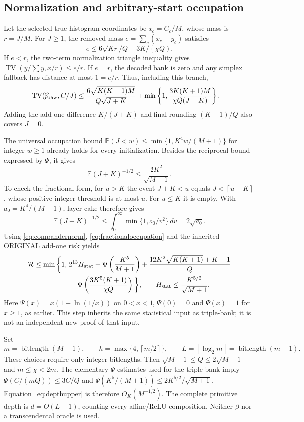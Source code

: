 \documentclass[11pt,letterpaper]{article}
\theoremstyle{definition}\newtheorem{definition}[theorem]{Definition}
\theoremstyle{remark}\newtheorem{remark}[theorem]{Remark}
\newcommand{\TV}{\operatorname{TV}}
\newcommand{\E}{\mathbb{E}}
\newcommand{\Prob}{\mathbb{P}}
\newcommand{\ceil}[1]{\left\lceil #1\right\rceil}
\newcommand{\Risk}{\mathcal{R}}
\newcommand{\bl}{\operatorname{bitlength}}
\begin{document}
\subsection{Normalization and arbitrary-start occupation}
Let the selected true histogram coordinates be $x_c=C_c/M$, whose mass is $r=J/M$. For $J\ge1$, the removed mass $e=\sum_c(x_c-y_c)$ satisfies
\[
 e\le6\sqrt{Kr}/Q+3K/(\chi Q).
\]
If $e<r$, the two-term normalization triangle inequality gives
$\TV(y/\sum y,x/r)\le e/r$. If $e=r$, the decoded bank is zero and any simplex fallback has distance at most $1=e/r$. Thus, including this branch,
\begin{align}\label{eq:compandernorm}
 \TV(\widehat p_{\rm raw},C/J)
 &\le\frac{6\sqrt{K(K+1)M}}{Q\sqrt{J+K}}
   +\min\left\{1,\frac{3K(K+1)M}{\chi Q(J+K)}\right\}.
\end{align}
Adding the add-one difference $K/(J+K)$ and final rounding $(K-1)/Q$ also covers $J=0$.

The universal occupation bound
$\Prob(J<w)\le\min\{1,K^4w/(M+1)\}$ for integer $w\ge1$
already holds for every initialization. Besides the reciprocal bound expressed by $\Psi$, it gives
\begin{equation}\label{eq:fractionaloccupation}
 \E(J+K)^{-1/2}\le\frac{2K^2}{\sqrt{M+1}}.
\end{equation}
To check the fractional form, for $u>K$ the event $J+K<u$ equals
$J<\ceil{u-K}$, whose positive integer threshold is at most $u$.
For $u\le K$ it is empty. With $a_0=K^4/(M+1)$, layer cake therefore gives
\[
 \E(J+K)^{-1/2}
 \le\int_0^\infty\min\{1,a_0/v^2\}\,dv=2\sqrt{a_0}.
\]
Using \eqref{eq:compandernorm}, \eqref{eq:fractionaloccupation} and the inherited ORIGINAL add-one risk yields
\begin{equation}\label{eq:depthupper}
 \begin{split}
 \Risk\le\min\bigg\{1,\;&2^{13}H_{\rm stat}
 +\Psi\left(\frac{K^5}{M+1}\right)
 +\frac{12K^2\sqrt{K(K+1)}+K-1}{Q}\\
 &+\Psi\left(\frac{3K^5(K+1)}{\chi Q}\right)\bigg\},
 \qquad H_{\rm stat}\le\frac{K^{5/2}}{\sqrt{M+1}}.
 \end{split}
\end{equation}
Here $\Psi(x)=x(1+\ln(1/x))$ on $0<x<1$, $\Psi(0)=0$ and $\Psi(x)=1$ for $x\ge1$, as earlier. This step inherits the same statistical input as triple-bank; it is not an independent new proof of that input.

Set
\[
 m=\bl(M+1),\qquad h=\max\{4,\ceil{m/2}\},\qquad
 L=\ceil{\log_2m}=\bl(m-1).
\]
These choices require only integer bitlengths. Then
$\sqrt{M+1}\le Q\le2\sqrt{M+1}$ and $m\le\chi<2m$.
The elementary $\Psi$ estimates used for the triple bank imply
$\Psi(C/(mQ))\le3C/Q$ and
$\Psi(K^5/(M+1))\le2K^{5/2}/\sqrt{M+1}$.
Equation~\eqref{eq:depthupper} is therefore $O_K(M^{-1/2})$.
The complete primitive depth is $d=O(L+1)$, counting every affine/ReLU composition. Neither $\beta$ nor a transcendental oracle is used.
\end{document}
